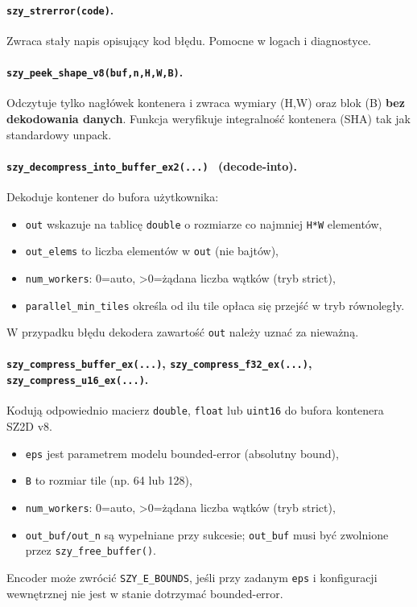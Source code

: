 \documentclass[11pt,a4paper]{article}
\begin{document}
\paragraph{\texttt{szy\_strerror(code)}.}
Zwraca stały napis opisujący kod błędu. Pomocne w logach i diagnostyce.

\paragraph{\texttt{szy\_peek\_shape\_v8(buf,n,H,W,B)}.}
Odczytuje tylko nagłówek kontenera i zwraca wymiary (H,W) oraz blok (B) \textbf{bez dekodowania danych}. Funkcja weryfikuje integralność kontenera (SHA) tak jak standardowy unpack.

\paragraph{\texttt{szy\_decompress\_into\_buffer\_ex2(...) } (decode-into).}
Dekoduje kontener do bufora użytkownika:
\begin{itemize}
  \item \texttt{out} wskazuje na tablicę \texttt{double} o rozmiarze co najmniej \texttt{H*W} elementów,
  \item \texttt{out\_elems} to liczba elementów w \texttt{out} (nie bajtów),
  \item \texttt{num\_workers}: 0=auto, >0=żądana liczba wątków (tryb strict),
  \item \texttt{parallel\_min\_tiles} określa od ilu tile opłaca się przejść w tryb równoległy.
\end{itemize}
W przypadku błędu dekodera zawartość \texttt{out} należy uznać za nieważną.

\paragraph{\texttt{szy\_compress\_buffer\_ex(...)}, \texttt{szy\_compress\_f32\_ex(...)}, \texttt{szy\_compress\_u16\_ex(...)}.}
Kodują odpowiednio macierz \texttt{double}, \texttt{float} lub \texttt{uint16} do bufora kontenera SZ2D v8.
\begin{itemize}
  \item \texttt{eps} jest parametrem modelu bounded-error (absolutny bound),
  \item \texttt{B} to rozmiar tile (np. 64 lub 128),
  \item \texttt{num\_workers}: 0=auto, >0=żądana liczba wątków (tryb strict),
  \item \texttt{out\_buf/out\_n} są wypełniane przy sukcesie; \texttt{out\_buf} musi być zwolnione przez \texttt{szy\_free\_buffer()}.
\end{itemize}
Encoder może zwrócić \texttt{SZY\_E\_BOUNDS}, jeśli przy zadanym \texttt{eps} i konfiguracji wewnętrznej nie jest w stanie dotrzymać bounded-error.
\end{document}
